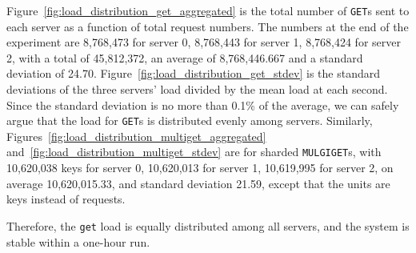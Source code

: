 Figure~\ref{fig:load_distribution_get_aggregated} is the total number of \texttt{GET}s sent to each server as a function of total request numbers. The numbers at the end of the experiment are 8,768,473 for server 0, 8,768,443 for server 1, 8,768,424 for server 2, with a total of 45,812,372, an average of 8,768,446.667 and a standard deviation of 24.70. Figure~\ref{fig:load_distribution_get_stdev} is the standard deviations of the three servers' load divided by the mean load at each second. Since the standard deviation is no more than 0.1\% of the average, we can safely argue that the load for \texttt{GET}s is distributed evenly among servers. Similarly, Figures~\ref{fig:load_distribution_multiget_aggregated} and~\ref{fig:load_distribution_multiget_stdev} are for sharded \texttt{MULGIGET}s, with 10,620,038 keys for server 0, 10,620,013 for server 1, 10,619,995 for server 2, on average 10,620,015.33, and standard deviation 21.59, except that the units are keys instead of requests. 

Therefore, the \texttt{get} load is equally distributed among all servers, and the system is stable within a one-hour run.
